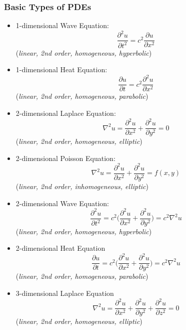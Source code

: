 \subsubsection{Basic Types of PDEs}
\begin{itemize}
    \item 1-dimensional Wave Equation:
    \begin{equation}
        \frac{\partial ^2 u}{\partial t^2} = c^2\frac{\partial u}{\partial x^2}
    \end{equation}
    (\textit{linear, 2nd order, homogeneous, hyperbolic})
    \item 1-dimensional Heat Equation:
    \begin{equation}
        \frac{\partial u}{\partial t} = c^2 \frac{\partial ^2 u}{\partial x^2}
    \end{equation}
    (\textit{linear, 2nd order, homogeneous, parabolic})
    \item 2-dimensional Laplace Equation:
    \begin{equation}
        \nabla^2 u=\frac{\partial^2 u}{\partial x^2}+\frac{\partial ^2 u}{\partial y^2}=0
    \end{equation}
    (\textit{linear, 2nd order, homogeneous, elliptic})
    \item 2-dimensional Poisson Equation:
    \begin{equation}
        \nabla^2 u=\frac{\partial^2 u}{\partial x^2}+\frac{\partial^2 u}{\partial y^2}=f(x,y)
    \end{equation}
    (\textit{linear, 2nd order, inhomogeneous, elliptic})
    \item 2-dimensional Wave Equation:
    \begin{equation}
        \frac{\partial^2u}{\partial t^2}=c^2 \Bigr(\frac{\partial^2 u}{\partial x^2}+\frac{\partial ^2 u}{\partial y^2}\Bigr)=c^2\nabla^2 u
    \end{equation}
    (\textit{linear, 2nd order, homogeneous, hyperbolic})
    \item 2-dimensional Heat Equation
    \begin{equation}
        \frac{\partial u}{\partial t}=c^2\Bigr(\frac{\partial^2 u}{\partial x^2}+\frac{\partial ^2 u}{\partial y^2}\Bigr)=c^2\nabla^2 u
    \end{equation}
    (\textit{linear, 2nd order, homogeneous, parabolic})
    \item 3-dimensional Laplace Equation
    \begin{equation}
        \nabla^2 u=\frac{\partial^2 u}{\partial x^2}+\frac{\partial ^2 u}{\partial y^2}+\frac{\partial ^2 u}{\partial z^2}=0
    \end{equation}
    (\textit{linear, 2nd order, homogeneous, elliptic})
\end{itemize}
%
%
